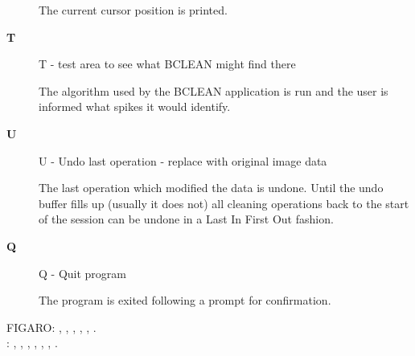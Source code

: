 \begin{description}
    The current cursor position is printed.
\item [{\bf T}]
 T - test area to see what BCLEAN might find there

    The algorithm used by the BCLEAN application is run and the user
    is informed what spikes it would identify.
\item [{\bf U}]
 U - Undo last operation - replace with original image data

    The last operation which modified the data is undone.  Until the
    undo buffer fills up (usually it does not) all cleaning operations
    back to the start of the session can be undone in a Last In First
    Out fashion.
\item [{\bf Q}]
 Q - Quit program

    The program is exited following a prompt for confirmation.
\end{description}

\item [{\bf See also:}]
FIGARO: , , , , , .\\
: , , , , , , .\\

